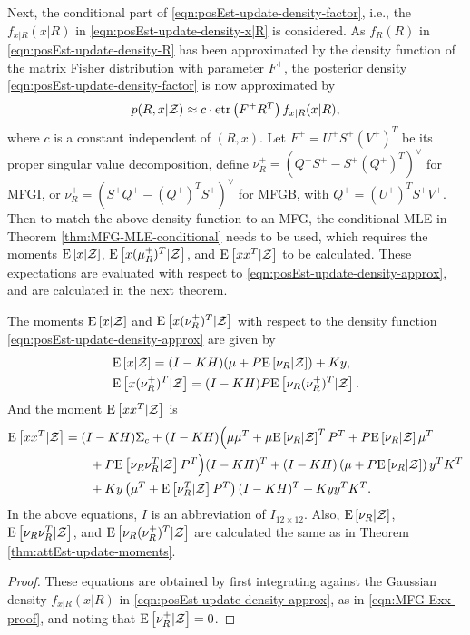 Next, the conditional part of \eqref{eqn:posEst-update-density-factor}, i.e., the $f_{x|R}(x|R)$ in \eqref{eqn:posEst-update-density-x|R} is considered.
As $f_R(R)$ in \eqref{eqn:posEst-update-density-R} has been approximated by the density function of the matrix Fisher distribution with parameter $F^+$, the posterior density \eqref{eqn:posEst-update-density-factor} is now approximated by
\begin{align} \label{eqn:posEst-update-density-approx}
	p(R,x|\mathcal{Z}) \approx c \cdot \mathrm{etr}\left( F^+R^T \right) f_{x|R}(x|R),
\end{align}
where $c$ is a constant independent of $(R,x)$.
Let $F^+ = U^+S^+(V^+)^T$ be its proper singular value decomposition, define $\nu_R^+ = (Q^+S^+ - S^+(Q^+)^T)^\vee$ for MFGI, or $\nu_R^+ = (S^+Q^+ - (Q^+)^TS^+)^\vee$ for MFGB, with $Q^+ = (U^+)^TS^+V^+$.
Then to match the above density function to an MFG, the conditional MLE in Theorem \ref{thm:MFG-MLE-conditional} needs to be used, which requires the moments $\mathrm{E}\left[ x|\mathcal{Z} \right]$, $\mathrm{E}\left[ x(\mu_R^+)^T|\mathcal{Z} \right]$, and $\mathrm{E}\left[ xx^T|\mathcal{Z} \right]$ to be calculated.
These expectations are evaluated with respect to \eqref{eqn:posEst-update-density-approx}, and are calculated in the next theorem.

\begin{theorem} \label{thm:posEst-update-moments}
	The moments $\mathrm{E}\left[ x|\mathcal{Z} \right]$ and $\mathrm{E}\left[ x(\nu_R^+)^T|\mathcal{Z} \right]$ with respect to the density function \eqref{eqn:posEst-update-density-approx} are given by
	\begin{align}
		&\mathrm{E}\left[ x|\mathcal{Z} \right] = (I-KH)(\mu+P\mathrm{E}\left[ \nu_R|\mathcal{Z} \right]) + Ky, \\
		&\mathrm{E}\left[ x(\nu_R^+)^T|\mathcal{Z} \right] = (I-KH)P\mathrm{E}\left[ \nu_R(\nu_R^+)^T|\mathcal{Z} \right].
	\end{align}
	And the moment $\mathrm{E}\left[ xx^T|\mathcal{Z} \right]$ is
	\begin{align}
		\mathrm{E}\left[ xx^T|\mathcal{Z} \right] &= (I-KH)\Sigma_c + (I-KH) \Big( \mu\mu^T + \mu\mathrm{E}\left[ \nu_R|\mathcal{Z} \right]^TP^T + P\mathrm{E}\left[ \nu_R|\mathcal{Z} \right]\mu^T \nonumber \\
		&\qquad + P\mathrm{E}\left[ \nu_R\nu_R^T|\mathcal{Z} \right]P^T \Big) (I-KH)^T + (I-KH)\left( \mu + P\mathrm{E}\left[ \nu_R|\mathcal{Z} \right] \right)y^TK^T \nonumber \\
		&\qquad + Ky\left(\mu^T + \mathrm{E}\left[ \nu_R^T|\mathcal{Z} \right]P^T\right)(I-KH)^T + Kyy^TK^T.
	\end{align}
	In the above equations, $I$ is an abbreviation of $I_{12\times 12}$.
	Also, $\mathrm{E}\left[ \nu_R|\mathcal{Z} \right]$, $\mathrm{E}\left[ \nu_R\nu_R^T|\mathcal{Z} \right]$, and $\mathrm{E}\left[ \nu_R(\nu_R^+)^T|\mathcal{Z} \right]$ are calculated the same as in Theorem \ref{thm:attEst-update-moments}.
\end{theorem}
\begin{proof}
	These equations are obtained by first integrating against the Gaussian density $f_{x|R}(x|R)$ in \eqref{eqn:posEst-update-density-approx}, as in \eqref{eqn:MFG-Exx-proof}, and noting that $\mathrm{E}\left[ \nu_R^+|\mathcal{Z} \right] = 0$.
\end{proof}

